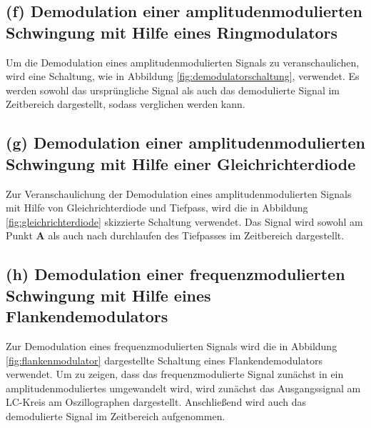 \FloatBarrier
\subsection{(f) Demodulation einer amplitudenmodulierten Schwingung
mit Hilfe eines Ringmodulators}
\label{subsec:durchfuehrung_f}
Um die Demodulation eines amplitudenmodulierten Signals zu veranschaulichen,
wird eine Schaltung, wie in Abbildung \ref{fig:demodulatorschaltung},
verwendet. Es werden sowohl das ursprüngliche Signal als auch das
demodulierte Signal im Zeitbereich dargestellt, sodass verglichen werden kann.


\FloatBarrier
\subsection{(g) Demodulation einer amplitudenmodulierten Schwingung
mit Hilfe einer Gleichrichterdiode}
\label{subsec:durchfuehrung_g}
Zur Veranschaulichung der Demodulation eines amplitudenmodulierten Signals
mit Hilfe von Gleichrichterdiode und Tiefpass, wird die in Abbildung
\ref{fig:gleichrichterdiode} skizzierte Schaltung verwendet.
Das Signal wird sowohl am Punkt \textbf{A} als auch nach durchlaufen des Tiefpasses
im Zeitbereich dargestellt.


\FloatBarrier
\subsection{(h) Demodulation einer frequenzmodulierten Schwingung
mit Hilfe eines Flankendemodulators}
\label{subsec:durchfuehrung_h}
Zur Demodulation eines frequenzmodulierten Signals wird die in Abbildung
\ref{fig:flankenmodulator} dargestellte Schaltung eines Flankendemodulators verwendet.
Um zu zeigen, dass das frequenzmodulierte Signal zunächst in ein
amplitudenmoduliertes umgewandelt wird, wird zunächst das Ausgangssignal
am LC-Kreis am Oszillographen dargestellt. Anschließend wird
auch das demodulierte Signal im Zeitbereich aufgenommen.
